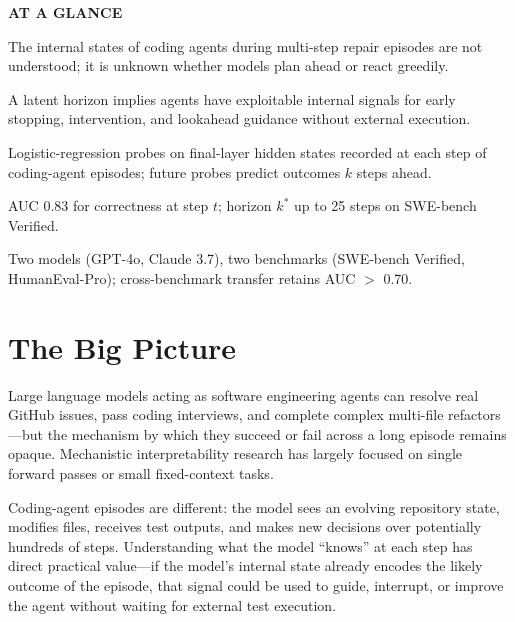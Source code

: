 \documentclass[10pt,twocolumn]{article}
\begin{document}
\begin{mdframed}[backgroundcolor=boxgray,linecolor=rulered,linewidth=1pt,
    innerleftmargin=6pt,innerrightmargin=6pt,
    innertopmargin=6pt,innerbottommargin=6pt]
\textbf{\small AT A GLANCE}\par\vspace{4pt}
\begin{description}[leftmargin=0pt,labelsep=4pt,itemsep=2pt,parsep=0pt,
    font=\small\bfseries]
  \item[Problem:] The internal states of coding agents during multi-step
    repair episodes are not understood; it is unknown whether models
    plan ahead or react greedily.
  \item[Why it matters:] A latent horizon implies agents have exploitable
    internal signals for early stopping, intervention, and lookahead
    guidance without external execution.
  \item[Method:] Logistic-regression probes on final-layer hidden states
    recorded at each step of coding-agent episodes; future probes
    predict outcomes $k$ steps ahead.
  \item[Result:] AUC 0.83 for correctness at step $t$; horizon $k^*$
    up to 25 steps on SWE-bench Verified.
  \item[Evidence:] Two models (GPT-4o, Claude 3.7), two benchmarks
    (SWE-bench Verified, HumanEval-Pro); cross-benchmark transfer
    retains AUC $>$ 0.70.
\end{description}
\end{mdframed}

\section{The Big Picture}

Large language models acting as software engineering agents can resolve
real GitHub issues, pass coding interviews, and complete complex
multi-file refactors---but the mechanism by which they succeed or fail
across a long episode remains opaque. Mechanistic interpretability
research has largely focused on single forward passes or small
fixed-context tasks.

Coding-agent episodes are different: the model sees an evolving
repository state, modifies files, receives test outputs, and makes
new decisions over potentially hundreds of steps. Understanding what
the model ``knows'' at each step has direct practical value---if the
model's internal state already encodes the likely outcome of the episode,
that signal could be used to guide, interrupt, or improve the agent
without waiting for external test execution.
\end{document}
